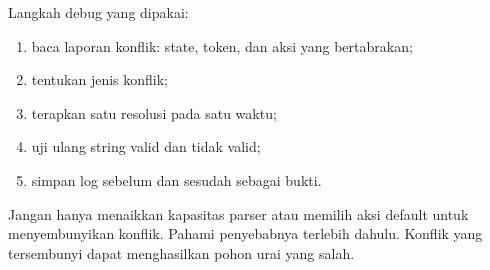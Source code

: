 Langkah debug yang dipakai:
\begin{enumerate}[label=\arabic*.,leftmargin=*]
  \item baca laporan konflik: state, token, dan aksi yang bertabrakan;
  \item tentukan jenis konflik;
  \item terapkan satu resolusi pada satu waktu;
  \item uji ulang string valid dan tidak valid;
  \item simpan log sebelum dan sesudah sebagai bukti.
\end{enumerate}

\begin{warningbox}
Jangan hanya menaikkan kapasitas parser atau memilih aksi default
untuk menyembunyikan konflik. Pahami penyebabnya terlebih dahulu.
Konflik yang tersembunyi dapat menghasilkan pohon urai yang salah.
\end{warningbox}

